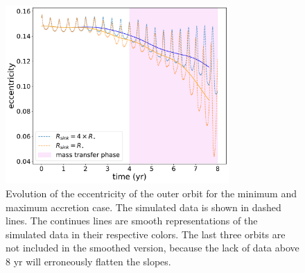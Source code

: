 \begin{figure}[H]
    \centering
    \includegraphics[width=0.76\textwidth]{Thesis/graphs/accretion_case/accretion_outer_ecc.pdf}
    \caption{Evolution of the eccentricity of the outer orbit for the minimum and maximum accretion case. The simulated data is shown in dashed lines. The continues lines are smooth representations of the simulated data in their respective colors. The last three orbits are not included in the smoothed version, because the lack of data above $8$ yr will erroneously flatten the slopes.}
    \label{fig:accretion_outer_ecc}
\end{figure}
